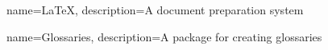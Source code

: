 {
    name={LaTeX},
    description={A document preparation system}
}

{
    name={Glossaries},
    description={A package for creating glossaries}
}
